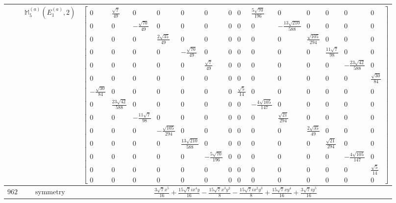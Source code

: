 \documentclass[fleqn,8pt,landscape]{jsarticle}
\begin{document}
\begin{longtable}{ccc}
$  $ & $ \mathbb{M}_{5}^{(a)}(E_{1}^{(a)},2) $ & $ \begin{bmatrix} 0 & \frac{\sqrt{7}}{49} & 0 & 0 & 0 & 0 & 0 & 0 & \frac{5 \sqrt{70}}{196} & 0 & 0 & 0 & 0 & 0 \\ 0 & 0 & - \frac{\sqrt{70}}{49} & 0 & 0 & 0 & 0 & 0 & 0 & - \frac{13 \sqrt{210}}{588} & 0 & 0 & 0 & 0 \\ 0 & 0 & 0 & \frac{2 \sqrt{35}}{49} & 0 & 0 & 0 & 0 & 0 & 0 & \frac{\sqrt{105}}{294} & 0 & 0 & 0 \\ 0 & 0 & 0 & 0 & - \frac{\sqrt{70}}{49} & 0 & 0 & 0 & 0 & 0 & 0 & \frac{11 \sqrt{7}}{98} & 0 & 0 \\ 0 & 0 & 0 & 0 & 0 & \frac{\sqrt{7}}{49} & 0 & 0 & 0 & 0 & 0 & 0 & - \frac{23 \sqrt{42}}{588} & 0 \\ 0 & 0 & 0 & 0 & 0 & 0 & 0 & 0 & 0 & 0 & 0 & 0 & 0 & \frac{\sqrt{30}}{84} \\ - \frac{\sqrt{30}}{84} & 0 & 0 & 0 & 0 & 0 & 0 & \frac{\sqrt{5}}{14} & 0 & 0 & 0 & 0 & 0 & 0 \\ 0 & \frac{23 \sqrt{42}}{588} & 0 & 0 & 0 & 0 & 0 & 0 & - \frac{4 \sqrt{105}}{147} & 0 & 0 & 0 & 0 & 0 \\ 0 & 0 & - \frac{11 \sqrt{7}}{98} & 0 & 0 & 0 & 0 & 0 & 0 & \frac{\sqrt{21}}{294} & 0 & 0 & 0 & 0 \\ 0 & 0 & 0 & - \frac{\sqrt{105}}{294} & 0 & 0 & 0 & 0 & 0 & 0 & \frac{2 \sqrt{35}}{49} & 0 & 0 & 0 \\ 0 & 0 & 0 & 0 & \frac{13 \sqrt{210}}{588} & 0 & 0 & 0 & 0 & 0 & 0 & \frac{\sqrt{21}}{294} & 0 & 0 \\ 0 & 0 & 0 & 0 & 0 & - \frac{5 \sqrt{70}}{196} & 0 & 0 & 0 & 0 & 0 & 0 & - \frac{4 \sqrt{105}}{147} & 0 \\ 0 & 0 & 0 & 0 & 0 & 0 & 0 & 0 & 0 & 0 & 0 & 0 & 0 & \frac{\sqrt{5}}{14} \\ 0 & 0 & 0 & 0 & 0 & 0 & 0 & 0 & 0 & 0 & 0 & 0 & 0 & 0 \end{bmatrix} $ \\ \hline
$ 962 $ & $ \text{symmetry} $ & $ \frac{3 \sqrt{7} x^{5}}{16} + \frac{15 \sqrt{7} i x^{4} y}{16} - \frac{15 \sqrt{7} x^{3} y^{2}}{8} - \frac{15 \sqrt{7} i x^{2} y^{3}}{8} + \frac{15 \sqrt{7} x y^{4}}{16} + \frac{3 \sqrt{7} i y^{5}}{16} $ \\

\end{longtable}
\end{document}
